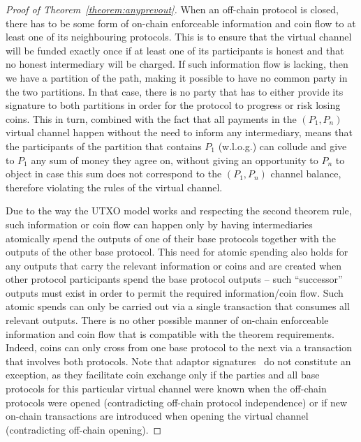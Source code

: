  \begin{proof}[Proof of Theorem~\ref{theorem:anyprevout}]
    When an off-chain protocol is closed, there has to be some form of
    on-chain enforceable information and coin flow to at least one of its neighbouring
    protocols. This is to ensure that the virtual channel will be funded exactly
    once if at least one of its participants is honest and that no honest
    intermediary will be charged. If such information flow is lacking, then we
    have a partition of the path, making it possible to have no common party in
    the two partitions. In that case, there is no party that has to either
    provide its signature to both partitions in order for the protocol to
    progress or risk losing coins. This in turn, combined with the fact that all
    payments in the $(P_1, P_n)$ virtual channel happen without the need to
    inform any intermediary, means that the participants of the partition that
    contains $P_1$ (w.l.o.g.) can collude and give to $P_1$ any sum of money
    they agree on, without giving an opportunity to $P_n$ to object in case this
    sum does not correspond to the $(P_1, P_n)$ channel balance, therefore
    violating the rules of the virtual channel.

    Due to the way the UTXO model works and respecting the second theorem rule,
    such information or coin flow can
    happen only by having intermediaries atomically spend the outputs of one of
    their base protocols together with the outputs of the other base protocol.
    This need for atomic spending also holds for any outputs that carry the
    relevant information or coins and are created when other protocol
    participants spend the base protocol outputs -- such ``successor'' outputs
    must exist in order to permit the required information/coin flow. Such
    atomic spends can only be carried out via a single transaction that consumes
    all relevant outputs. There is no other possible manner of on-chain
    enforceable information and coin flow that is compatible with the theorem
    requirements. Indeed, coins can only cross from one base protocol to the
    next via a transaction that involves both protocols. Note that adaptor
    signatures~\cite{cryptoeprint:2020:476} do not constitute an exception, as
    they facilitate coin exchange only if the parties and all base protocols for
    this particular virtual channel were known when the off-chain protocols were
    opened (contradicting off-chain protocol independence) or if new on-chain
    transactions are introduced when opening the virtual channel (contradicting
    off-chain opening).


\end{proof}
